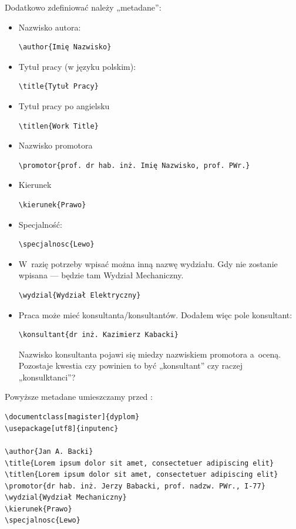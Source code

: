 \begin{enumerate}
Dodatkowo zdefiniować należy „metadane”:
\begin{itemize}
\item
Nazwisko autora:
\begin{verbatim}
\author{Imię Nazwisko}
\end{verbatim}
\item
Tytuł pracy (w języku polskim):
\begin{verbatim}
\title{Tytuł Pracy}
\end{verbatim}
\item
Tytuł pracy po angielsku
\begin{verbatim}
\titlen{Work Title}
\end{verbatim}
\item
Nazwisko promotora
\begin{verbatim}
\promotor{prof. dr hab. inż. Imię Nazwisko, prof. PWr.}
\end{verbatim}
\item
Kierunek
\begin{verbatim}
\kierunek{Prawo}
\end{verbatim}
\item
Specjalność:
\begin{verbatim}
\specjalnosc{Lewo}
\end{verbatim}
\item
W~razię potrzeby wpisać można inną nazwę wydziału. Gdy nie zostanie wpisana — będzie tam Wydział Mechaniczny.
\begin{verbatim}
\wydzial{Wydział Elektryczny}
\end{verbatim}
\item
Praca może mieć konsultanta/konsultantów. Dodałem więc pole konsultant:
\begin{verbatim}
\konsultant{dr inż. Kazimierz Kabacki}
\end{verbatim}
Nazwisko konsultanta pojawi się miedzy nazwiskiem promotora a~oceną. Pozostaje kwestia czy powinien to być „konsultant” czy raczej „konsulktanci”?
\end{itemize}
Powyższe metadane umieszczamy przed \verb||:
\begin{verbatim}
\documentclass[magister]{dyplom}
\usepackage[utf8]{inputenc}

\author{Jan A. Backi}
\title{Lorem ipsum dolor sit amet, consectetuer adipiscing elit}
\titlen{Lorem ipsum dolor sit amet, consectetuer adipiscing elit}
\promotor{dr hab. inż. Jerzy Babacki, prof. nadzw. PWr., I-77}
\wydzial{Wydział Mechaniczny}
\kierunek{Prawo}
\specjalnosc{Lewo}



\end{verbatim}
\end{enumerate}
